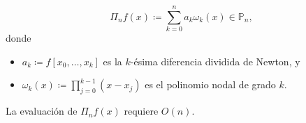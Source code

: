 \begin{frame}



	\begin{definition}
		\begin{equation*}
			\Pi_{n}
			f\left(x\right)\coloneqq
			\sum\limits_{k=0}^{n}
			a_{k}
			\omega_{k}\left(x\right)\in\mathbb{P}_{n},
		\end{equation*}
		donde
		\begin{itemize}
			\item

			      \begin{math}
				      a_{k}\coloneqq
				      f\left[x_{0},\ldots,x_{k}\right]
			      \end{math}
			      es la \alert{$k$-ésima diferencia dividida de Newton}, y

			\item

			      \begin{math}
				      \omega_{k}
				      \left(x\right)\coloneqq
				      \prod\limits_{j=0}^{k-1}
				      \left(
				      x-x_{j}
				      \right)
			      \end{math}
			      es el \alert{polinomio nodal de grado $k$}.
		\end{itemize}
		La evaluación de $\Pi_{n}f\left(x\right)$ requiere
		$O\left(n\right)$.
	\end{definition}
\end{frame}

